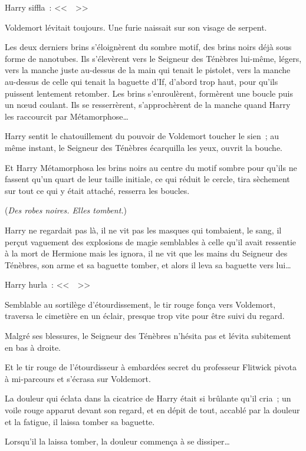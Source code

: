 Harry siffla~: <<~~>>

Voldemort lévitait toujours. Une furie naissait sur son visage de serpent.

Les deux derniers brins s'éloignèrent du sombre motif, des brins noirs déjà sous forme de nanotubes. Ils s'élevèrent vers le Seigneur des Ténèbres lui-même, légers, vers la manche juste au-dessus de la main qui tenait le pistolet, vers la manche au-dessus de celle qui tenait la baguette d'If, d'abord trop haut, pour qu'ils puissent lentement retomber. Les brins s'enroulèrent, formèrent une boucle puis un nœud coulant. Ils se resserrèrent, s'approchèrent de la manche quand Harry les raccourcit par Métamorphose…

Harry sentit le chatouillement du pouvoir de Voldemort toucher le sien~; au même instant, le Seigneur des Ténèbres écarquilla les yeux, ouvrit la bouche.

Et Harry Métamorphosa les brins noirs au centre du motif sombre pour qu'ils ne fassent qu'un quart de leur taille initiale, ce qui réduit le cercle, tira sèchement sur tout ce qui y était attaché, resserra les boucles.

(\emph{Des robes noires. Elles tombent.})

Harry ne regardait pas là, il ne vit pas les masques qui tombaient, le sang, il perçut vaguement des explosions de magie semblables à celle qu'il avait ressentie à la mort de Hermione mais les ignora, il ne vit que les mains du Seigneur des Ténèbres, son arme et sa baguette tomber, et alors il leva sa baguette vers lui…

Harry hurla~: <<~~>>

Semblable au sortilège d'étourdissement, le tir rouge fonça vers Voldemort, traversa le cimetière en un éclair, presque trop vite pour être suivi du regard.

Malgré ses blessures, le Seigneur des Ténèbres n'hésita pas et lévita subitement en bas à droite.

Et le tir rouge de l'étourdisseur à embardées secret du professeur Flitwick pivota à mi-parcours et s'écrasa sur Voldemort.

La douleur qui éclata dans la cicatrice de Harry était si brûlante qu'il cria~; un voile rouge apparut devant son regard, et en dépit de tout, accablé par la douleur et la fatigue, il laissa tomber sa baguette.

Lorsqu'il la laissa tomber, la douleur commença à se dissiper… 

